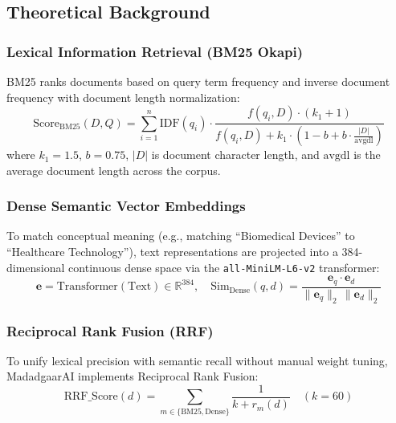 \documentclass[12pt,a4paper]{article}
\begin{document}
\subsection{Theoretical Background}

\subsubsection{Lexical Information Retrieval (BM25 Okapi)}
BM25 ranks documents based on query term frequency and inverse document frequency with document length normalization:
\begin{equation}
    \text{Score}_{\text{BM25}}(D, Q) = \sum_{i=1}^{n} \text{IDF}(q_i) \cdot \frac{f(q_i, D) \cdot (k_1 + 1)}{f(q_i, D) + k_1 \cdot \left(1 - b + b \cdot \frac{|D|}{\text{avgdl}}\right)}
\end{equation}
where $k_1 = 1.5$, $b = 0.75$, $|D|$ is document character length, and $\text{avgdl}$ is the average document length across the corpus.

\subsubsection{Dense Semantic Vector Embeddings}
To match conceptual meaning (e.g., matching ``Biomedical Devices'' to ``Healthcare Technology''), text representations are projected into a 384-dimensional continuous dense space via the \texttt{all-MiniLM-L6-v2} transformer:
\begin{equation}
    \mathbf{e} = \text{Transformer}(\text{Text}) \in \mathbb{R}^{384}, \quad \text{Sim}_{\text{Dense}}(q, d) = \frac{\mathbf{e}_q \cdot \mathbf{e}_d}{\|\mathbf{e}_q\|_2 \, \|\mathbf{e}_d\|_2}
\end{equation}

\subsubsection{Reciprocal Rank Fusion (RRF)}
To unify lexical precision with semantic recall without manual weight tuning, MadadgaarAI implements Reciprocal Rank Fusion:
\begin{equation}
    \text{RRF\_Score}(d) = \sum_{m \in \{\text{BM25}, \text{Dense}\}} \frac{1}{k + r_m(d)} \quad (k = 60)
\end{equation}

\end{document}
